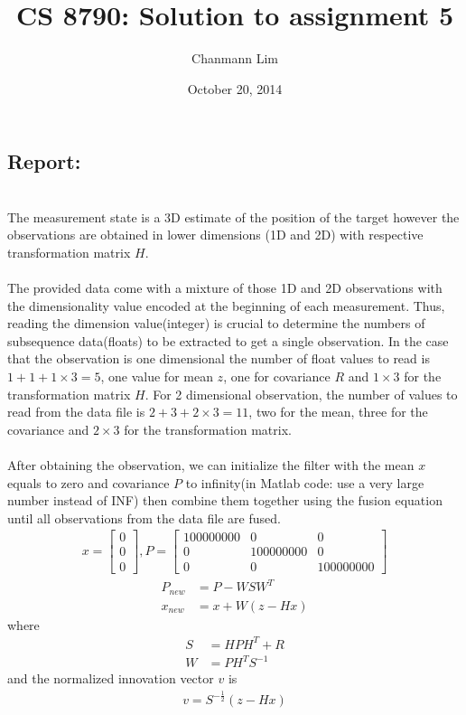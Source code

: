 \documentclass[a4paper]{article}
\begin{document}
\title{CS 8790: Solution to assignment 5}
\author{Chanmann Lim}
\date{October 20, 2014}
\maketitle

\subsection*{Report:} ~\\
\indent The measurement state is a 3D estimate of the position of the target however the observations are obtained in lower dimensions (1D and 2D) with respective transformation matrix $H$. \\
\\
\indent The provided data come with a mixture of those 1D and 2D observations with the dimensionality value encoded at the beginning of each measurement. Thus, reading the dimension value(integer) is crucial to determine the numbers of subsequence data(floats) to be extracted to get a single observation. In the case that the observation is one dimensional the number of float values to read is $1+1+1\times3=5$, one value for mean $z$, one for covariance $R$ and $1\times3$ for the transformation matrix $H$. For 2 dimensional observation, the number of values to read from the data file is $2+3+2\times3=11$, two for the mean, three for the covariance and $2\times3$ for the transformation matrix.\\
\\
\indent After obtaining the observation, we can initialize the filter with the mean $x$ equals to zero and covariance $P$ to infinity(in Matlab code: use a very large number instead of INF) then combine them together using the fusion equation until all observations from the data file are fused.\\
\begin{align*}
x = \begin{bmatrix}
		0   \\  0   \\   0
	\end{bmatrix}, 
P = \begin{bmatrix}
		100000000   &  0   &   0 \\
		0   &  100000000   &   0 \\
		0   &  0   &   100000000
	\end{bmatrix}
\end{align*}
\begin{align*}
P_{new} &= P - WSW^{T}\\
x_{new} &= x + W(z - Hx)
\end{align*}
where
\begin{align*}
S &= HPH^{T} + R\\
W &= PH^{T}S^{-1}
\end{align*}
and the normalized innovation vector $v$ is
\begin{align*}
v = S^{-\frac{1}{2}}(z-Hx)
\end{align*}
\end{document}

